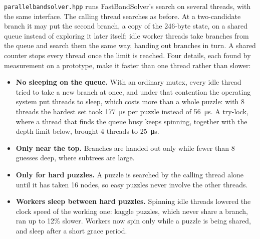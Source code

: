 \documentclass[11pt]{article}
\theoremstyle{definition}
\theoremstyle{plain}
\begin{document}
\texttt{parallelbandsolver.hpp} runs FastBandSolver's search on several threads, with the same interface. The calling
thread searches as before. At a two-candidate branch it may put the second branch, a copy of the 246-byte state, on a
shared queue instead of exploring it later itself; idle worker threads take branches from the queue and search them the
same way, handing out branches in turn. A shared counter stops every thread once the limit is reached. Four details,
each found by measurement on a prototype, make it faster than one thread rather than slower:
\begin{itemize}
\item \textbf{No sleeping on the queue.} With an ordinary mutex, every idle thread tried to take a new branch at once, and
  under that contention the operating system put threads to sleep, which costs more than a whole puzzle: with 8 threads
  the hardest set took \SI{177}{\micro\second} per puzzle instead of \SI{56}{\micro\second}. A try-lock, where a thread that finds the queue busy keeps
  spinning, together with the depth limit below, brought 4 threads to \SI{25}{\micro\second}.
\item \textbf{Only near the top.} Branches are handed out only while fewer than 8 guesses deep, where subtrees are large.
\item \textbf{Only for hard puzzles.} A puzzle is searched by the calling thread alone until it has taken 16 nodes, so
  easy puzzles never involve the other threads.
\item \textbf{Workers sleep between hard puzzles.} Spinning idle threads lowered the clock speed of the working one:
  kaggle puzzles, which never share a branch, ran up to 12\% slower. Workers now spin only while a puzzle is being shared,
  and sleep after a short grace period.
\end{itemize}
\end{document}
